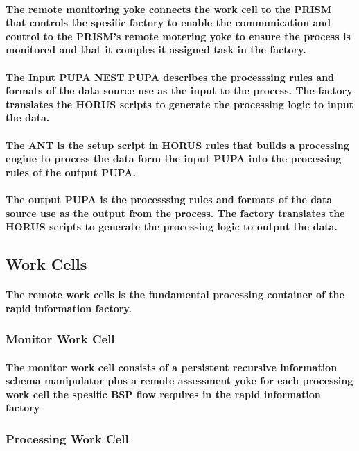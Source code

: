 \documentclass{acm_proc_article-sp}
\begin{document}
\paragraph{The remote monitoring yoke connects the work cell to the PRISM that controls the spesific factory to enable the communication and control to the PRISM's remote motering yoke to ensure the process is monitored and that it comples it assigned task in the factory.}
\paragraph{The Input PUPA NEST PUPA describes the processsing rules and formats of the data source use as the input to the process. The factory translates the HORUS scripts to generate the processing logic to input the data.}
\paragraph{The ANT is the setup script in HORUS rules that builds a processing engine to process the data form the input PUPA into the processing rules of the output PUPA. }
\paragraph{The output PUPA is the processsing rules and formats of the data source use as the output from the process. The factory translates the HORUS scripts to generate the processing logic to output the data.}
\pagebreak
\subsection{Work Cells}
\paragraph{The remote work cells is the fundamental processing container of the rapid information factory.}
\subsubsection{Monitor Work Cell}
\paragraph{The monitor work cell consists of a persistent recursive information schema manipulator plus a remote assessment yoke for each processing work cell the spesific BSP flow requires in the rapid information factory}
\subsubsection{Processing Work Cell}
\end{document}
